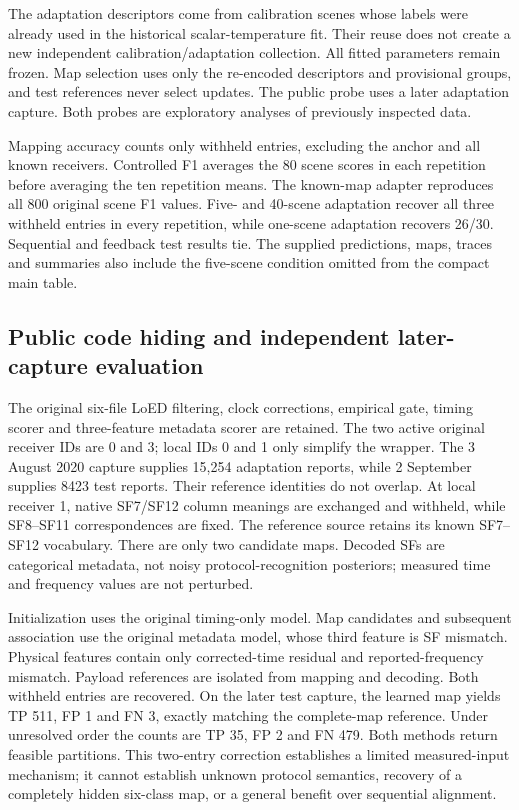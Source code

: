 \documentclass[10pt,a4paper]{article}
\begin{document}
The adaptation descriptors come from calibration scenes whose labels were already used in the historical scalar-temperature fit. Their reuse does not create a new independent calibration/adaptation collection. All fitted parameters remain frozen. Map selection uses only the re-encoded descriptors and provisional groups, and test references never select updates. The public probe uses a later adaptation capture. Both probes are exploratory analyses of previously inspected data.

Mapping accuracy counts only withheld entries, excluding the anchor and all known receivers. Controlled F1 averages the 80 scene scores in each repetition before averaging the ten repetition means. The known-map adapter reproduces all 800 original scene F1 values. Five- and 40-scene adaptation recover all three withheld entries in every repetition, while one-scene adaptation recovers 26/30. Sequential and feedback test results tie. The supplied predictions, maps, traces and summaries also include the five-scene condition omitted from the compact main table.

\subsection{Public code hiding and independent later-capture evaluation}
The original six-file LoED filtering, clock corrections, empirical gate, timing scorer and three-feature metadata scorer are retained. The two active original receiver IDs are 0 and 3; local IDs 0 and 1 only simplify the wrapper. The 3 August 2020 capture supplies 15,254 adaptation reports, while 2 September supplies 8423 test reports. Their reference identities do not overlap. At local receiver 1, native SF7/SF12 column meanings are exchanged and withheld, while SF8--SF11 correspondences are fixed. The reference source retains its known SF7--SF12 vocabulary. There are only two candidate maps. Decoded SFs are categorical metadata, not noisy protocol-recognition posteriors; measured time and frequency values are not perturbed.

Initialization uses the original timing-only model. Map candidates and subsequent association use the original metadata model, whose third feature is SF mismatch. Physical features contain only corrected-time residual and reported-frequency mismatch. Payload references are isolated from mapping and decoding. Both withheld entries are recovered. On the later test capture, the learned map yields TP 511, FP 1 and FN 3, exactly matching the complete-map reference. Under unresolved order the counts are TP 35, FP 2 and FN 479. Both methods return feasible partitions. This two-entry correction establishes a limited measured-input mechanism; it cannot establish unknown protocol semantics, recovery of a completely hidden six-class map, or a general benefit over sequential alignment.
\end{document}
